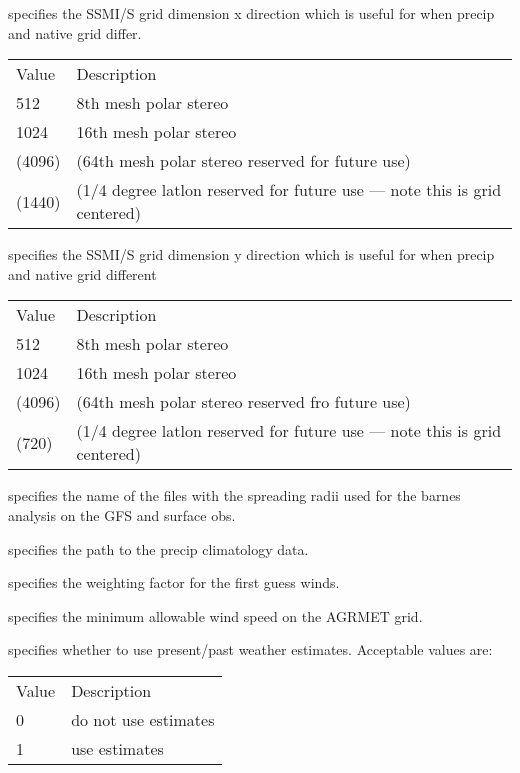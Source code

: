   specifies the SSMI/S grid dimension x direction
 which is useful for when precip and native grid differ.

 \begin{tabular}{ll}
 Value  & Description                                      \\
 512    & 8th mesh polar stereo                            \\
 1024   & 16th mesh polar stereo                           \\
 (4096) & (64th mesh polar stereo reserved for future use) \\
 (1440) & (1/4 degree latlon reserved for future use --- note
          this is grid centered) \\
 \end{tabular}

  specifies the SSMI/S grid dimension y direction
 which is useful for when precip and native grid different

 \begin{tabular}{ll}
 Value  & Description                                      \\
 512    & 8th mesh polar stereo                            \\
 1024   & 16th mesh polar stereo                           \\
 (4096) & (64th mesh polar stereo reserved fro future use) \\
 (720)  & (1/4 degree latlon reserved for future use --- note
          this is grid centered) \\
 \end{tabular}

  specifies the name of the files with
 the spreading radii used for the barnes analysis on the GFS and
 surface obs.

  specifies the path to the precip 
 climatology data.

  specifies the weighting factor for the
 first guess winds.

  specifies the minimum allowable wind
 speed on the AGRMET grid.

  specifies whether to 
 use present/past weather estimates.
 Acceptable values are:

 \begin{tabular}{ll}
 Value & Description          \\
 0     & do not use estimates \\
 1     & use estimates        \\
 \end{tabular}

